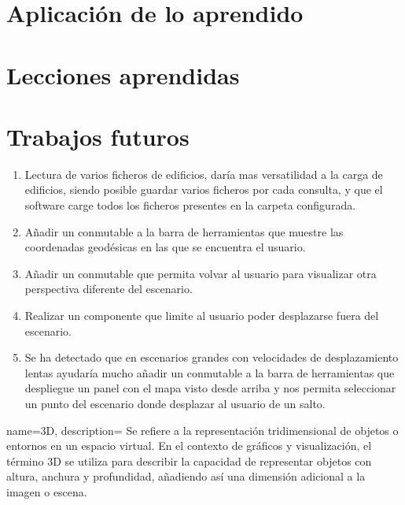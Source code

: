 \documentclass[a4paper, 11pt]{book}
\begin{document}
\section{Aplicación de lo aprendido}
\label{sec:aplicacion}


\section{Lecciones aprendidas}
\label{sec:lecciones_aprendidas}

\section{Trabajos futuros}
\begin{enumerate}
    \item Lectura de varios ficheros de edificios, daría mas versatilidad a la carga de edificios, siendo posible guardar varios ficheros por cada consulta, y que el software carge todos los ficheros presentes en la carpeta configurada.
    \item Añadir un conmutable a la barra de herramientas que muestre las coordenadas geodésicas en las que se encuentra el usuario.
    \item Añadir un conmutable que permita volvar al usuario para visualizar otra perspectiva diferente del escenario.
    \item Realizar un componente que limite al usuario poder desplazarse fuera del escenario.
    \item Se ha detectado que en escenarios grandes con velocidades de desplazamiento lentas ayudaría mucho añadir un conmutable a la barra de herramientas que despliegue un panel con el mapa visto desde arriba y nos permita seleccionar un punto del escenario donde desplazar al usuario de un salto.
\end{enumerate}
\label{sec:trabajos_futuros}
\nocite{*}


{
    name=3D,
    description={
    Se refiere a la representación tridimensional de objetos o entornos en un espacio virtual. En el contexto de gráficos y visualización, el término 3D se utiliza para describir la capacidad de representar objetos con altura, anchura y profundidad, añadiendo así una dimensión adicional a la imagen o escena.
    }
}
\end{document}
